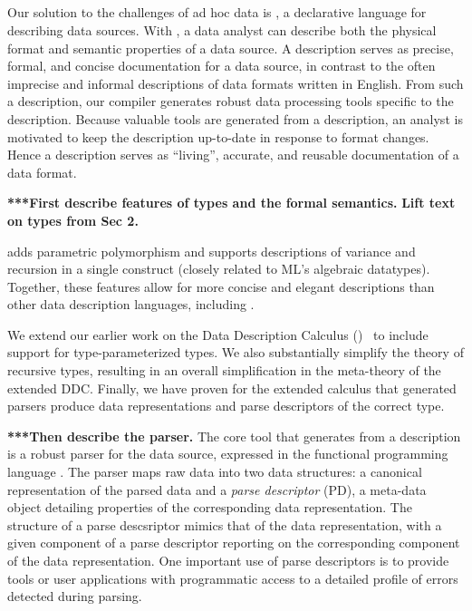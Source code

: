 
\subsection{\padsmlbig{}}

Our solution to the challenges of ad hoc data is \padsml{}, a
declarative language for describing data sources.  With \padsml{}, a
data analyst can describe both the physical format and semantic
properties of a data source.  A \padsml{} description serves as
precise, formal, and concise documentation for a data source, in
contrast to the often imprecise and informal descriptions of data
formats written in English.  From such a \padsml{} description, our
compiler generates robust data processing tools specific to the
description.  Because valuable tools are generated from a description,
an analyst is motivated to keep the description up-to-date in response
to format changes.  Hence a description serves as ``living'',
accurate, and reusable documentation of a data format.

\textbf{***First describe features of \padsml{} types and the formal semantics.}
\textbf{Lift text on types from Sec 2.}

\padsml{} adds parametric polymorphism
  and supports descriptions of variance and recursion 
  in a single construct (closely related to ML's algebraic datatypes).
  Together, these features allow for more concise and elegant
  descriptions than other data description languages, including
  \padsc{}.

We extend our earlier work on the Data Description Calculus
  (\ddcold{})~\cite{fisher+:next700ddl} to include support for
  type-parameterized types. We also 
  substantially simplify the theory of recursive types, resulting in
  an overall simplification in the meta-theory of the extended DDC.
  Finally, we have proven for the extended calculus that generated
  parsers produce data representations and parse descriptors of the
  correct type.

\textbf{***Then describe the parser.}
The core tool that \padsml{} generates from a description is a robust
parser for the data source, expressed in the functional programming
language \ocaml{}.  The parser maps raw data into two data structures:
a canonical representation of the parsed data and a \textit{parse
descriptor} (PD), a meta-data object detailing properties of the
corresponding data representation.  The structure of a parse
descsriptor mimics that of the data representation, with a given
component of a parse descriptor reporting on the corresponding
component of the data representation.  One important use of parse
descriptors is to provide \padsml{} tools or user applications with
programmatic access to a detailed profile of errors detected during
parsing.

